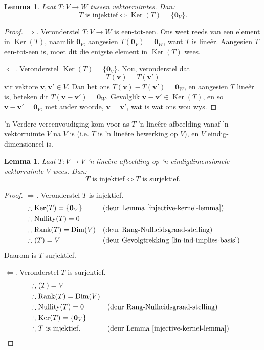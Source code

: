 \documentclass[a4paper,11pt]{book}
\newtheorem{lemma}[theorem]{Lemma}
\theoremstyle{definition}
\newcommand{\ve}[1]{\mathbf{#1}}
\DeclareMathOperator{\Dim}{Dim}
\DeclareMathOperator{\Ker}{Ker}
\DeclareMathOperator{\Nullity}{Nullity}
\DeclareMathOperator{\Rank}{Rank}
\let\Im\relax
\DeclareMathOperator{\Im}{Im} %
\begin{document}
\begin{lemma} \label{injective-kernel-lemma} Laat $T : V \rightarrow W$
	tussen vektorruimtes. Dan:
	\[
		\mbox{$T$ is injektief} \Longleftrightarrow \mbox{$\Ker(T) =
		\{\ve{0}_V\}$}.
	\]
\end{lemma}
\begin{proof} $\Rightarrow$. Veronderstel $T : V \rightarrow W$ is
	een-tot-een. Ons weet reeds van een element in $\Ker(T)$, naamlik
	$\ve{0}_V$, aangesien $T(\ve{0}_V) = \ve{0}_W$, want $T$ is line{\^e}r.
	Aangesien $T$ een-tot-een is, moet dit die enigste element in $\Ker(T)$
	wees.

	$\Leftarrow$. Veronderstel $\Ker(T) = \{\ve{0}_V\}$. Nou, veronderstel
	dat 
	\[
		T(\ve{v}) = T(\ve{v}')
	\]
	vir vektore $\ve{v}, \ve{v}' \in V$.  Dan het ons $T(\ve{v}) -
	T(\ve{v}') = \ve{0}_W$, en aangesien $T$ line{\^e}r is, beteken dit
	$T(\ve{v} - \ve{v}') = \ve{0}_W$. Gevolglik $\ve{v} - \ve{v}' \in
	\Ker(T)$, en so $\ve{v} - \ve{v}' = \ve{0}_V$, met ander woorde,
	$\ve{v} = \ve{v}'$, wat is wat ons wou wys.
\end{proof}

'n Verdere vereenvoudiging kom voor as $T$ 'n line{\^e}re afbeelding vanaf
'n vektorruimte $V$ na $V$ is (i.e. $T$ is 'n line{\^e}re bewerking op
$V$), en $V$ eindig-dimensioneel is.

\begin{lemma} \label{inj-surj} Laat $T : V \rightarrow V$ 'n line{\^e}re
	afbeelding op 'n eindigdimensionele vektorruimte $V$ wees. Dan:
	\[
		\mbox{$T$ is injektief} \Longleftrightarrow \mbox{$T$ is
		surjektief}.
	\]
\end{lemma}
\begin{proof}
	$\Rightarrow$. Veronderstel $T$ is injektief. 
	\begin{align*}
		&\therefore \Ker(T) = \{\ve{0}_V\} && \mbox{(deur Lemma
		\ref{injective-kernel-lemma})}  \\
		&\therefore \Nullity(T) = 0 \\
		&\therefore \Rank(T) = \Dim(V) && \mbox{(deur
		Rang-Nulheidsgraad-stelling)} \\
		&\therefore \Im(T) = V && \mbox{(deur Gevolgtrekking
		\ref{lin-ind-implies-basis})}
	\end{align*}
	Daarom is $T$ surjektief.

	$\Leftarrow$. Veronderstel $T$ is surjektief.
	\begin{align*}
		&\therefore \Im(T) = V \\
		&\therefore \Rank(T) = \Dim(V) \\
		&\therefore \Nullity(T) = 0 && \mbox{(deur
		Rang-Nulheidsgraad-stelling)} \\
		&\therefore \Ker(T) = \{\ve{0}_V\} \\
		&\therefore \mbox{$T$ is injektief. }  && \mbox{(deur Lemma
		\ref{injective-kernel-lemma})}
	\end{align*}
\end{proof}
\end{document}
